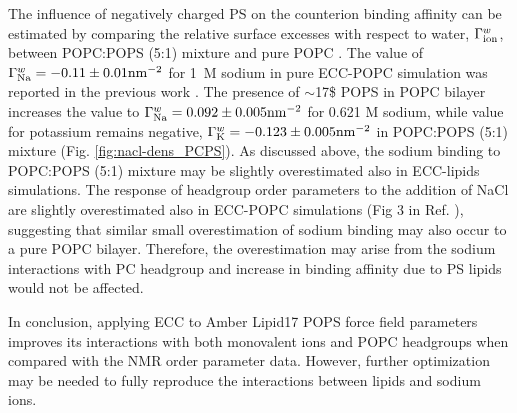 \documentclass[journal=jpcbfk,manuscript=article]{achemso}
\begin{document}
% 
%
The influence of negatively charged PS on the counterion binding affinity can
be estimated by comparing the relative surface excesses with respect to water, $\Gamma ^{w} _{\rm ion}$,
between POPC:POPS (5:1) mixture and pure POPC \cite{melcr18}.
The value of $\Gamma ^{w} _{\rm Na}=-0.11 \pm 0.01 \mathrm{nm}^{-2}$ for 1~M sodium in pure ECC-POPC
simulation was reported in the previous work \cite{melcr18}.
The presence of $\sim$17\$ POPS in POPC bilayer increases the
value to $\Gamma ^{w} _{\rm Na}=0.092 \pm 0.005 \mathrm{nm}^{-2}$ 
for 0.621 M sodium, while value for potassium remains negative,
$\Gamma ^{w} _{\rm K}=-0.123 \pm 0.005 \mathrm{nm}^{-2}$ in POPC:POPS (5:1) mixture (Fig. \ref{fig:nacl-dens_PCPS}).
As discussed above, the sodium binding to POPC:POPS (5:1) mixture may be slightly overestimated also in
ECC-lipids simulations. The response of headgroup order parameters to the addition of NaCl are
slightly overestimated also in ECC-POPC simulations (Fig 3 in Ref. ),
suggesting that similar small overestimation of sodium binding may also occur to a pure POPC bilayer.
Therefore, the overestimation may arise from the sodium interactions with PC headgroup and
increase in binding affinity due to PS lipids would not be affected.

In conclusion, applying ECC to Amber Lipid17 POPS force field parameters improves its
interactions with both monovalent ions and POPC headgroups when compared with the NMR order parameter data.
However, further optimization may be needed to fully reproduce the interactions between lipids and
sodium ions.
\end{document}
